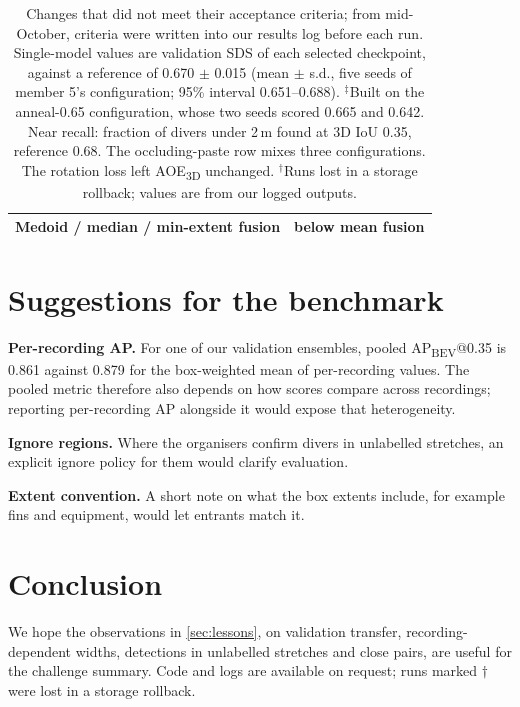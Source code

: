 \documentclass[10pt,twocolumn,letterpaper]{article}
\makeatletter
\newcommand{\sds}{\mbox{SDS}}
\newcommand{\aoe}{\mbox{AOE\textsubscript{3D}}}
\newcommand{\apb}[1]{\mbox{AP\textsubscript{BEV}@#1}}
\makeatother
\begin{document}
\begin{table}[t]
\begin{tabular}{@{}lr@{}}
Medoid / median / min-extent fusion & below mean fusion \\
\bottomrule
\end{tabular}
\caption{Changes that did not meet their acceptance criteria; from mid-October, criteria were written into our results log before each run. Single-model values are validation \sds{} of each selected checkpoint, against a reference of 0.670 $\pm$ 0.015 (mean $\pm$ s.d., five seeds of member 5's configuration; 95\% interval 0.651--0.688). $^\ddagger$Built on the anneal-0.65 configuration, whose two seeds scored 0.665 and 0.642. Near recall: fraction of divers under 2\,m found at 3D IoU 0.35, reference 0.68. The occluding-paste row mixes three configurations. The rotation loss left \aoe{} unchanged. $^\dagger$Runs lost in a storage rollback; values are from our logged outputs.}
\label{tab:negative}
\end{table}

\section{Suggestions for the benchmark}
\label{sec:suggestions}
\textbf{Per-recording AP.}
For one of our validation ensembles, pooled \apb{0.35} is 0.861 against 0.879 for the box-weighted mean of per-recording values.
The pooled metric therefore also depends on how scores compare across recordings; reporting per-recording AP alongside it would expose that heterogeneity.

\textbf{Ignore regions.}
Where the organisers confirm divers in unlabelled stretches, an explicit ignore policy for them would clarify evaluation.

\textbf{Extent convention.}
A short note on what the box extents include, for example fins and equipment, would let entrants match it.

\section{Conclusion}
We hope the observations in \cref{sec:lessons}, on validation transfer, recording-dependent widths, detections in unlabelled stretches and close pairs, are useful for the challenge summary.
Code and logs are available on request; runs marked $\dagger$ were lost in a storage rollback.

{
    \small\raggedright
    
    
}
\end{document}
